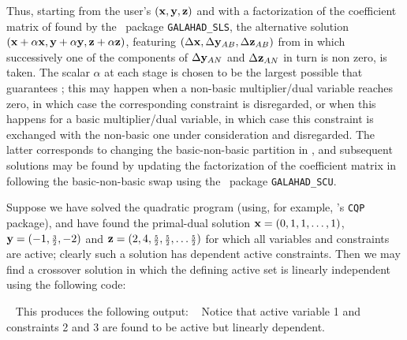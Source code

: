 \documentclass{galahad}
\begin{document}
Thus, starting from the user's $({\mathbf{x}}, {\mathbf{y}}, {\mathbf{z}})$
and with a factorization of the coefficient matrix of 
found by the \galahad\ package {\tt GALAHAD\_SLS},
the alternative solution
$({\mathbf{x}} + \alpha {\mathbf{x}}, {\mathbf{y}} + \alpha {\mathbf{y}}, {\mathbf{z}} + \alpha {\mathbf{z}})$,
featuring
$(\Delta {\mathbf{x}}, \Delta {\mathbf{y}}_{AB}, \Delta {\mathbf{z}}_{AB})$
from 
in which successively one of the components of $\Delta {\mathbf{y}}_{AN}$
and $\Delta {\mathbf{z}}_{AN}$ in turn is non zero, is taken.
The scalar $\alpha$ at each stage
is chosen to be the largest possible that guarantees ;
this may happen when a non-basic multiplier/dual variable reaches zero,
in which case the corresponding constraint is disregarded, or when this
happens for a basic multiplier/dual variable, in which case this constraint is
exchanged with the non-basic one under consideration and disregarded.
The latter corresponds to changing the basic-non-basic partition
in , and subsequent solutions may be found by updating
the factorization of the coefficient matrix in 
following the basic-non-basic swap using the
\galahad\ package {\tt GALAHAD\_SCU}.


\galexample
Suppose we have solved the quadratic program
(using, for example, \galahad's {\tt CQP} package), and have found
the primal-dual solution ${\mathbf{x}} = (0,1,1, \ldots, 1)$,
${\mathbf{y}} = ( -1, {\scriptstyle \frac{3}{2}}, -2)$ and
${\mathbf{z}} = ( 2, 4, {\scriptstyle \frac{5}{2}}, {\scriptstyle \frac{5}{2}}, \ldots {\scriptstyle \frac{5}{2}})$
for which all variables and constraints are active; clearly such
a solution has dependent active constraints.
Then we may find a crossover solution in which the defining
active set is linearly independent using the following code:

{\tt \small
\VerbatimInput{\packageexample}
}
\noindent
This produces the following output:
{\tt \small
\VerbatimInput{\packageresults}
}
\noindent
Notice that active variable 1 and constraints 2 and 3 are found to be active but
linearly dependent.
\end{document}
